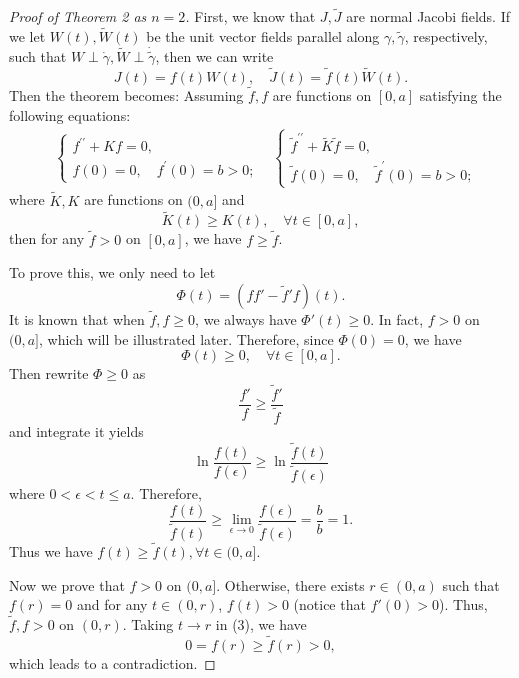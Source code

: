 \documentclass{ctexart}
\begin{document}
\begin{proof}[Proof of Theorem 2 as $n=2$]
  First, we know that $J, \widetilde{J}$ are normal Jacobi fields. If we let $W(t), \widetilde{W}(t)$ be the unit vector fields parallel
  along $\gamma, \widetilde{\gamma}$, respectively, such that $W \perp \dot{\gamma}, \widetilde{W} \perp \dot{\widetilde{\gamma}}$, then we can write
  $$
   J(t)=f(t) W(t), \quad\widetilde{J}(t)=\tilde{f}(t) \widetilde{W}(t).
  $$
  Then the theorem becomes:
  Assuming $\tilde{f}, f$ are functions on $[0, a]$ satisfying the following equations:
  $$
  \begin{aligned}
  & \left\{\begin{array}{l}
  f^{\prime \prime}+K f=0, \\
  f(0)=0, \quad f^{\prime}(0)=b>0 ;
  \end{array}\right.
  & \left\{\begin{array}{l}
    \tilde{f}^{\prime \prime}+\tilde{K} \tilde{f}=0, \\
    \tilde{f}(0)=0, \quad \tilde{f}^{\prime}(0)=b>0 ;
    \end{array}\right. 
  \end{aligned}
  $$
  where $\tilde{K}, K$ are functions on $(0, a]$ and
  $$
  \tilde{K}(t) \geq K(t), \quad \forall t \in[0, a],
  $$
  then for any $\tilde{f}>0$ on $[0, a]$, we have $f \geq \tilde{f}$. 
  
  To prove this, we only need to let 
  $$
  \Phi(t) = (ff' - \tilde{f}'f)(t).
  $$ 
  It is known that when $\tilde{f},f \geq 0$, we always have $\Phi'(t) \geq 0$. 
  In fact, $f>0$ on $(0,a]$, which will be illustrated later. Therefore, since $\Phi(0)=0$, we have
  $$
  \Phi(t) \geq 0, \quad \forall t \in [0,a].
  $$
  Then rewrite $\Phi \geq 0$ as
  \begin{equation}
    \frac{f' }{f} \geq \frac{\tilde{f}'}{\tilde{f}}
  \end{equation}
  and integrate it yields
  $$
  \ln\frac{f(t)}{f(\epsilon)} \geq \ln\frac{\tilde{f}(t)}{\tilde{f}(\epsilon)}
  $$
  where $0 < \epsilon < t \leq a$. Therefore,
  \begin{equation}
    \frac{f(t)}{\tilde{f}(t)} \geq \lim_{\epsilon \rightarrow 0} \frac{f(\epsilon)}{\tilde{f}(\epsilon)} = \frac{b}{b} = 1.
  \end{equation}
  Thus we have $f(t) \geq \tilde{f}(t), \forall t \in (0,a]$. 

  Now we prove that $f>0$ on $(0,a]$. Otherwise, there exists $r\in (0,a)$ such that $f(r)=0$ and for any $t\in (0,r)$, $f(t)>0$ (notice that $f'(0)>0$). 
  Thus, $\tilde{f},f > 0$ on $(0,r)$. Taking $t\rightarrow r$ in (3), we have
  $$
  0=f(r)\geq \tilde{f}(r)>0, 
  $$
  which leads to a contradiction.
\end{proof}
\end{document}
